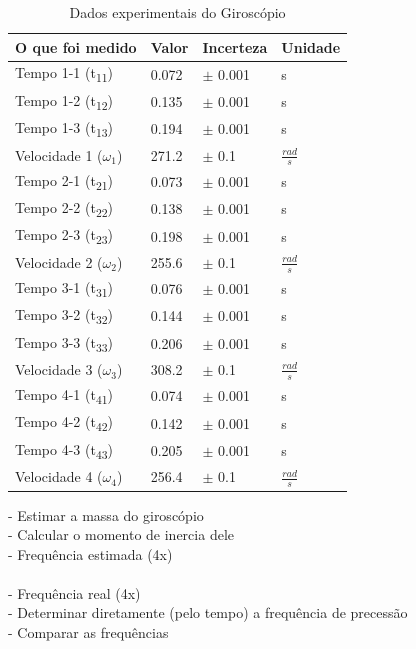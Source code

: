 \begin{table}[H]
    \centering
    \begin{tabular}{ |p{5cm}||p{2cm}||p{2cm}||p{2cm}|  }
        \hline
        \textbf{O que foi medido} & \textbf{Valor} & \textbf{Incerteza} & \textbf{Unidade}\\
        \hline
        Tempo 1-1 (t\textsubscript{11})     & 0.072     & $\pm$ 0.001   & s\\
        Tempo 1-2 (t\textsubscript{12})     & 0.135     & $\pm$ 0.001   & s\\
        Tempo 1-3 (t\textsubscript{13})     & 0.194     & $\pm$ 0.001   & s\\
        Velocidade 1 ($\omega _1$)          & 271.2     & $\pm$ 0.1     & $\frac{rad}{s}$\\
        \hline
        Tempo 2-1 (t\textsubscript{21})     & 0.073     & $\pm$ 0.001   & s\\
        Tempo 2-2 (t\textsubscript{22})     & 0.138     & $\pm$ 0.001   & s\\
        Tempo 2-3 (t\textsubscript{23})     & 0.198     & $\pm$ 0.001   & s\\
        Velocidade 2 ($\omega _2$)          & 255.6     & $\pm$ 0.1     & $\frac{rad}{s}$\\
        \hline
        Tempo 3-1 (t\textsubscript{31})     & 0.076     & $\pm$ 0.001   & s\\
        Tempo 3-2 (t\textsubscript{32})     & 0.144     & $\pm$ 0.001   & s\\
        Tempo 3-3 (t\textsubscript{33})     & 0.206     & $\pm$ 0.001   & s\\
        Velocidade 3 ($\omega _3$)          & 308.2     & $\pm$ 0.1     & $\frac{rad}{s}$\\
        \hline
        Tempo 4-1 (t\textsubscript{41})     & 0.074     & $\pm$ 0.001   & s\\
        Tempo 4-2 (t\textsubscript{42})     & 0.142     & $\pm$ 0.001   & s\\
        Tempo 4-3 (t\textsubscript{43})     & 0.205     & $\pm$ 0.001   & s\\
        Velocidade 4 ($\omega _4$)          & 256.4     & $\pm$ 0.1     & $\frac{rad}{s}$\\
        \hline
    \end{tabular}
    \caption{Dados experimentais do Giroscópio}
\end{table}

- Estimar a massa do giroscópio\\
- Calcular o momento de inercia dele\\
- Frequência estimada (4x) \\
\\
- Frequência real (4x)\\
- Determinar diretamente (pelo tempo) a frequência de precessão\\
- Comparar as frequências
